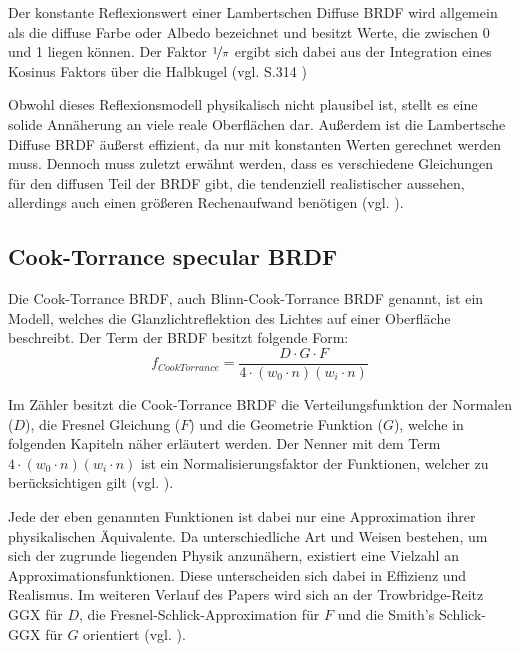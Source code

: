 \documentclass[
  11pt,
  a4paper,
  oneside
  ]{article}
\begin{document}
Der konstante Reflexionswert einer Lambertschen Diffuse BRDF wird allgemein als die diffuse Farbe oder Albedo bezeichnet und besitzt Werte, die zwischen 0 und 1 liegen können. Der Faktor $\nicefrac{1}{\pi}$ ergibt sich dabei aus der Integration eines Kosinus Faktors über die Halbkugel 
(vgl. S.314 \cite{realTimeRendering4th})

Obwohl dieses Reflexionsmodell physikalisch nicht plausibel ist, stellt es eine solide Annäherung an viele reale Oberflächen dar. Außerdem ist die Lambertsche Diffuse BRDF äußerst effizient, da nur mit konstanten Werten gerechnet werden muss. Dennoch muss zuletzt erwähnt werden, dass es verschiedene Gleichungen für den diffusen Teil der BRDF gibt, die tendenziell realistischer aussehen, allerdings auch einen größeren Rechenaufwand benötigen (vgl. \cite{learnOpenGL}).
\subsection{Cook-Torrance specular BRDF}
Die Cook-Torrance BRDF, auch Blinn-Cook-Torrance BRDF genannt, ist ein Modell, welches die Glanzlichtreflektion des Lichtes auf einer Oberfläche beschreibt. Der Term der BRDF besitzt folgende Form: 
\begin{equation}
  f_{CookTorrance}=\dfrac{D\cdot G\cdot F}{4\cdot \left( w_{0}\cdot n\right) \left( w_{i}\cdot n\right) }
\end{equation}

Im Zähler besitzt die Cook-Torrance BRDF die Verteilungsfunktion der Normalen ($D$), die Fresnel Gleichung ($F$) und die Geometrie Funktion ($G$), welche in folgenden Kapiteln näher erläutert werden.  Der Nenner mit dem Term $4\cdot \left( w_{0}\cdot n\right) \left( w_{i}\cdot n\right)$ ist ein Normalisierungsfaktor der Funktionen, welcher zu berücksichtigen gilt (vgl. \cite{learnOpenGL}).

Jede der eben genannten Funktionen ist dabei nur eine Approximation ihrer physikalischen Äquivalente. Da unterschiedliche Art und Weisen bestehen, um sich der zugrunde liegenden Physik anzunähern, existiert eine Vielzahl an Approximationsfunktionen. Diese unterscheiden sich dabei in Effizienz und Realismus. Im weiteren Verlauf des Papers wird sich an der Trowbridge-Reitz GGX für $D$, die Fresnel-Schlick-Approximation für $F$ und die Smith's Schlick-GGX für $G$ orientiert 
(vgl. \cite{learnOpenGL}).
\end{document}
